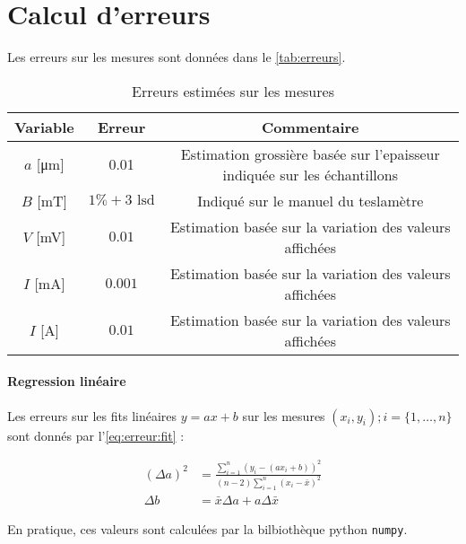 \section{Calcul d'erreurs}

Les erreurs sur les mesures sont données dans le \autoref{tab:erreurs}.

\begin{table}[h]
    \centering
    \begin{tabulary}{\textwidth}{C C C}
        \toprule
        Variable & Erreur & Commentaire \\
        \midrule
        \(a\) [\si{\micro\meter}] & 0.01 & Estimation grossière basée sur l'epaisseur indiquée sur les échantillons \\
        \(B\) [\si{\milli\tesla}] & \(1\% + 3\textrm{ lsd}\) & Indiqué sur le manuel du teslamètre \\
        \(V\) [\si{\milli\volt}] & \(0.01\) & Estimation basée sur la variation des valeurs affichées \\
        \(I\) [\si{\milli\ampere}] & \(0.001\) & Estimation basée sur la variation des valeurs affichées \\
        \(I\) [\si{\ampere}] & \(0.01\) & Estimation basée sur la variation des valeurs affichées \\
        \bottomrule
    \end{tabulary}
    \caption{Erreurs estimées sur les mesures}
    \label{tab:erreurs}
\end{table}

\paragraph*{Regression linéaire}
Les erreurs sur les fits linéaires \(y = ax + b\) sur les mesures \((x_i, y_i) ; i = \{1, \hdots, n\}\) sont donnés par l'\autoref{eq:erreur:fit} \cite{erreursmesure}:

\begin{equation}
    \label{eq:erreur:fit}
    \begin{aligned}
        (\Delta a)^2 &= \frac{\sum_{i=1}^{n}(y_i - (a x_i + b))^2}{(n-2) \sum_{i=1}^{n}(x_i - \bar{x})^2}\\
        \Delta b &= \bar{x} \Delta a + a \Delta \bar{x}
    \end{aligned}
\end{equation}

En pratique, ces valeurs sont calculées par la bilbiothèque python \texttt{numpy}.

